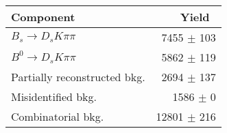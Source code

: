  \begin{tabular}{l r }
\hline\hline
Component & Yield\ \\
\hline
$B_s \to D_s K \pi \pi$ & 7455 $\pm$ 103 \\
$B^{0} \to D_s K \pi \pi$ & 5862 $\pm$ 119 \\
Partially reconstructed bkg. & 2694 $\pm$ 137 \\
Misidentified bkg. & 1586 $\pm$ 0 \\
Combinatorial bkg. & 12801 $\pm$ 216 \\
\hline\hline
\end{tabular}
\label{table:signalYields}
